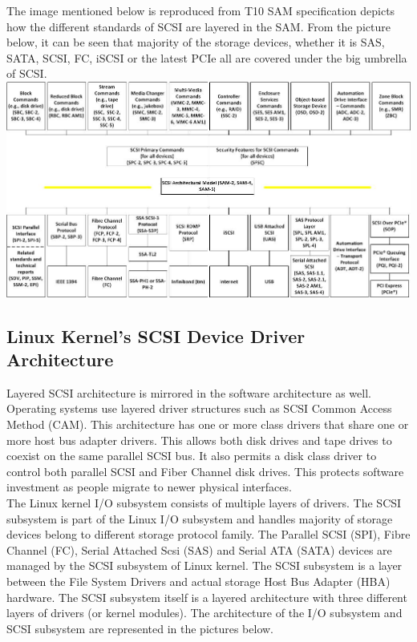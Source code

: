 The image mentioned below is reproduced from T10 SAM specification depicts how the different standards of SCSI are layered in the SAM.  From the picture below, it can be seen that majority of the storage devices, whether  it is SAS, SATA, SCSI, FC,  iSCSI or the latest PCIe all are covered under the big umbrella of SCSI.\\

\includegraphics[scale=.6]
{SAM}

\subsection{Linux Kernel’s SCSI Device Driver Architecture} 

Layered SCSI architecture is mirrored in the software architecture as well. Operating systems use layered driver structures such as SCSI Common Access Method (CAM). This architecture has one or more class drivers that share one or more host bus adapter drivers. This allows both disk drives and tape drives to coexist on the same parallel SCSI bus. It also permits a disk class driver to control both parallel SCSI and Fiber Channel disk drives. This protects software investment as people migrate to newer physical interfaces.\\

The Linux kernel I/O subsystem consists of multiple layers of drivers.  The SCSI subsystem is part of the Linux I/O subsystem and handles majority of storage devices belong to different storage protocol family.  The Parallel SCSI (SPI), Fibre Channel (FC), Serial Attached Scsi (SAS) and Serial ATA (SATA) devices are managed by the SCSI subsystem of Linux kernel.   The SCSI subsystem is a layer between the File System Drivers and actual storage Host Bus Adapter (HBA) hardware. The SCSI subsystem itself is a layered architecture with three different layers of drivers (or kernel modules). The architecture of the I/O subsystem and SCSI subsystem are represented in the pictures below.\\

